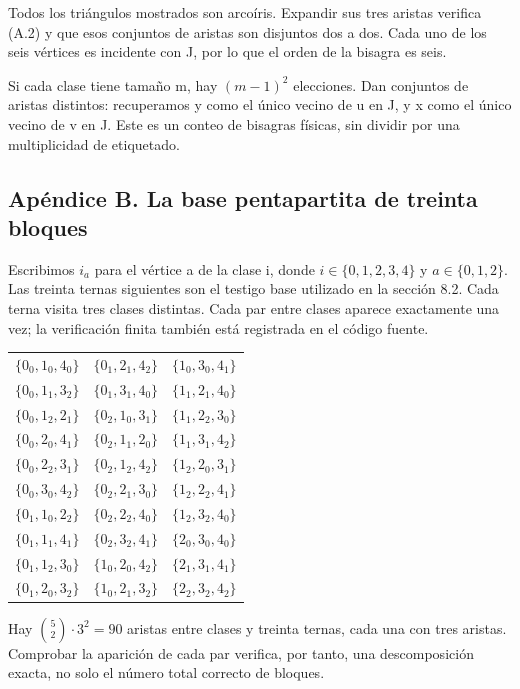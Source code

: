 \documentclass[spanish,11pt,a4paper]{article}
\begin{document}
Todos los triángulos mostrados son arcoíris. Expandir sus tres aristas verifica (A.2) y que esos conjuntos de aristas son disjuntos dos a dos. Cada uno de los seis vértices es incidente con J, por lo que el orden de la bisagra es seis.

Si cada clase tiene tamaño m, hay \((m-1)^2\) elecciones. Dan conjuntos de aristas distintos: recuperamos y como el único vecino de u en J, y x como el único vecino de v en J. Este es un conteo de bisagras físicas, sin dividir por una multiplicidad de etiquetado.

\subsection{Apéndice B. La base pentapartita de treinta bloques}\label{apuxe9ndice-b.-la-base-pentapartita-de-treinta-bloques}

Escribimos \(i_a\) para el vértice a de la clase i, donde \(i\in\{0,1,2,3,4\}\) y \(a\in\{0,1,2\}\). Las treinta ternas siguientes son el testigo base utilizado en la sección 8.2. Cada terna visita tres clases distintas. Cada par entre clases aparece exactamente una vez; la verificación finita también está registrada en el código fuente.

{\begin{longtable}[]{@{}lll@{}}
\toprule\noalign{}
\endhead
\bottomrule\noalign{}
\endlastfoot
\(\{0_0,1_0,4_0\}\) & \(\{0_1,2_1,4_2\}\) & \(\{1_0,3_0,4_1\}\) \\
\(\{0_0,1_1,3_2\}\) & \(\{0_1,3_1,4_0\}\) & \(\{1_1,2_1,4_0\}\) \\
\(\{0_0,1_2,2_1\}\) & \(\{0_2,1_0,3_1\}\) & \(\{1_1,2_2,3_0\}\) \\
\(\{0_0,2_0,4_1\}\) & \(\{0_2,1_1,2_0\}\) & \(\{1_1,3_1,4_2\}\) \\
\(\{0_0,2_2,3_1\}\) & \(\{0_2,1_2,4_2\}\) & \(\{1_2,2_0,3_1\}\) \\
\(\{0_0,3_0,4_2\}\) & \(\{0_2,2_1,3_0\}\) & \(\{1_2,2_2,4_1\}\) \\
\(\{0_1,1_0,2_2\}\) & \(\{0_2,2_2,4_0\}\) & \(\{1_2,3_2,4_0\}\) \\
\(\{0_1,1_1,4_1\}\) & \(\{0_2,3_2,4_1\}\) & \(\{2_0,3_0,4_0\}\) \\
\(\{0_1,1_2,3_0\}\) & \(\{1_0,2_0,4_2\}\) & \(\{2_1,3_1,4_1\}\) \\
\(\{0_1,2_0,3_2\}\) & \(\{1_0,2_1,3_2\}\) & \(\{2_2,3_2,4_2\}\) \\
\end{longtable}
}

Hay \(\binom52\cdot3^2=90\) aristas entre clases y treinta ternas, cada una con tres aristas. Comprobar la aparición de cada par verifica, por tanto, una descomposición exacta, no solo el número total correcto de bloques.
\end{document}

